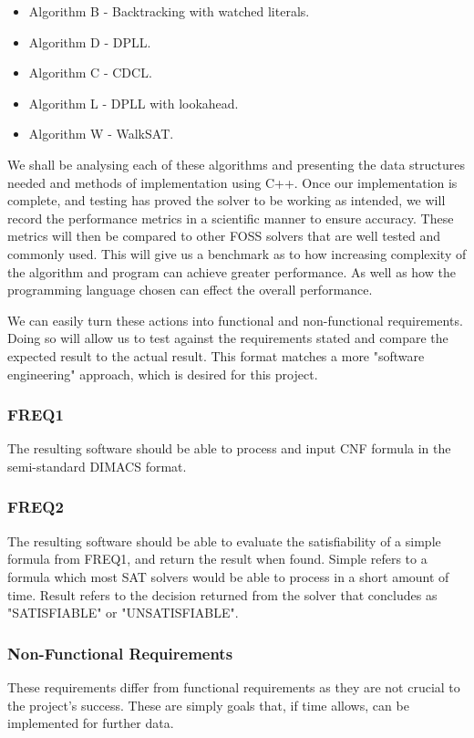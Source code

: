 \documentclass{article}
\begin{document}
\begin{itemize}
    \item Algorithm B - Backtracking with watched literals.
    \item Algorithm D - DPLL.
    \item Algorithm C - CDCL.
    \item Algorithm L - DPLL with lookahead.
    \item Algorithm W - WalkSAT.
\end{itemize}

We shall be analysing each of these algorithms and presenting the data structures needed and methods of implementation using C++. Once our implementation is complete, and testing has proved the solver to be working as intended, we will record the performance metrics in a scientific manner to ensure accuracy. These metrics will then be compared to other FOSS solvers that are well tested and commonly used. This will give us a benchmark as to how increasing complexity of the algorithm and program can achieve greater performance. As well as how the programming language chosen can effect the overall performance.

We can easily turn these actions into functional and non-functional requirements. Doing so will allow us to test against the requirements stated and compare the expected result to the actual result. This format matches a more "software engineering" approach, which is desired for this project.

\subsubsection{FREQ1}
The resulting software should be able to process and input CNF formula in the semi-standard DIMACS format.

\subsubsection{FREQ2}
The resulting software should be able to evaluate the satisfiability of a simple formula from FREQ1, and return the result when found. Simple refers to a formula which most SAT solvers would be able to process in a short amount of time. Result refers to the decision returned from the solver that concludes as "SATISFIABLE" or "UNSATISFIABLE".

\subsubsection{Non-Functional Requirements}
These requirements differ from functional requirements as they are not crucial to the project's success. These are simply goals that, if time allows, can be implemented for further data.
\end{document}
